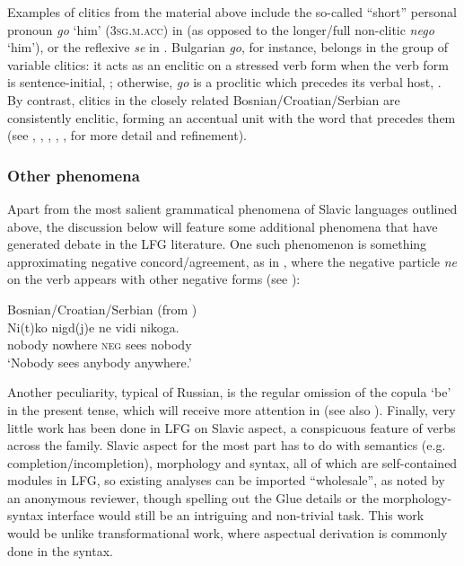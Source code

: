 \documentclass[output=paper,hidelinks]{langscibook}
\begin{document}
Examples of clitics from the material above include the so-called ``short'' personal pronoun \textit{go} `him' (\textsc{3sg.m.acc}) in  (as opposed to the longer/full non-clitic \textit{nego} `him'), or the reflexive \textit{se} in . Bulgarian \textit{go}, for instance, belongs in the group of variable clitics: it acts as an enclitic on a stressed verb form when the verb form is sentence-initial, ; otherwise, \textit{go} is a proclitic which precedes its verbal host, . By contrast, clitics in the closely related Bosnian/Croatian/Serbian are consistently enclitic, forming an accentual unit with the word that precedes them (see \citealt[345--346]{Browne1993}, \citealt{DimitrovaVulchanova1999}, \citealt[427--429]{BresnanEtAl2016}, \citealt{DiesingZec2016}, \citealt{ZecFilipova2016}, for more detail and refinement). 

\subsubsection{Other phenomena}
\label{sec:Slavic:1.2.6}

Apart from the most salient grammatical phenomena of Slavic languages outlined above, the discussion below will feature some additional phenomena that have generated debate in the LFG literature. One such phenomenon is something approximating negative concord/agreement, as in , where the negative particle \textit{ne} on the verb appears with other negative forms (see ):

\ea Bosnian/Croatian/Serbian (from \citealt[362]{Browne1993})\\%
    \label{ex:Slavic:5}
    \gll Ni(t)ko   nigd(j)e   ne   vidi   nikoga.\\
        nobody   nowhere   \textsc{neg}   sees   nobody\\
    \glt `Nobody sees anybody anywhere.' 
    \z

Another peculiarity, typical of Russian, is the regular omission of the copula `be' in the present tense, which will receive more attention in  (see also \citealt[861--864, 869, 874]{Timberlake1993}). Finally, very little work has been done in LFG on Slavic aspect, a conspicuous feature of verbs across the family. Slavic aspect for the most part has to do with semantics (e.g. completion/incompletion), morphology and syntax, all of which are self-contained modules in LFG, so existing analyses can be imported ``wholesale'', as noted by an anonymous reviewer, though spelling out the Glue details or the morphology-syntax interface would still be an intriguing and non-trivial task. This work would be unlike transformational work, where aspectual derivation is commonly done in the syntax.
\end{document}
